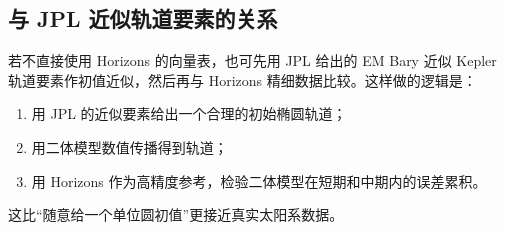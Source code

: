 \subsection{与 JPL 近似轨道要素的关系}

若不直接使用 Horizons 的向量表，也可先用 JPL 给出的 EM Bary 近似 Kepler 轨道要素作初值近似，然后再与 Horizons 精细数据比较。这样做的逻辑是：
\begin{enumerate}[label=\arabic*.]
  \item 用 JPL 的近似要素给出一个合理的初始椭圆轨道；
  \item 用二体模型数值传播得到轨道；
  \item 用 Horizons 作为高精度参考，检验二体模型在短期和中期内的误差累积。
\end{enumerate}
这比“随意给一个单位圆初值”更接近真实太阳系数据。

